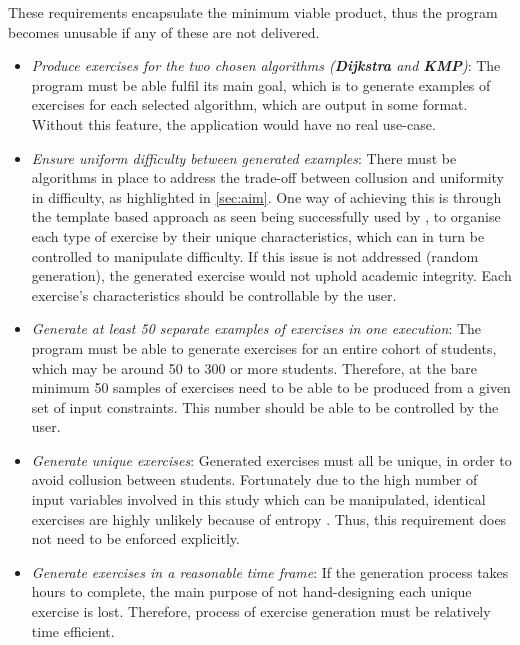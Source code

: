 \documentclass{l4proj}
\begin{document}
These requirements encapsulate the minimum viable product, thus the program becomes unusable if any of these are not delivered.
\begin{itemize}
	\item
	\emph{Produce exercises for the two chosen algorithms (\textbf{Dijkstra} and \textbf{KMP})}: The program must be able fulfil its main goal, which is to generate examples of exercises for each 		selected algorithm, which are output in some format. Without this feature, the application would have no real use-case. 
	\item
	\emph{Ensure uniform difficulty between generated examples}: There must be algorithms in place to address the trade-off between collusion and uniformity in difficulty, as highlighted in \autoref{sec:aim}. One way of achieving this is through the template based approach as seen being successfully used by \cite{Sad12}, to organise each type of exercise by their unique characteristics, which can in turn be controlled to manipulate difficulty. If this issue is not addressed (random generation), the generated exercise would not uphold academic integrity. Each exercise's characteristics should be controllable by the user.
	\item
	\emph{Generate at least 50 separate examples of exercises in one execution}: The program must be able to generate exercises for an entire cohort of students, which may be around 50 to 300 or more students. Therefore, at the bare minimum 50 samples of exercises need to be able to be produced from a given set of input constraints. This number should be able to be controlled by the user.
	\item
	\emph{Generate unique exercises}: Generated exercises must all be unique, in order to avoid collusion between students. Fortunately due to the high number of input variables involved in this study which can be manipulated, identical exercises are highly unlikely because of entropy \cite{}. Thus, this requirement does not need to be enforced explicitly.
	\item
	\emph{Generate exercises in a reasonable time frame}: If the generation process takes hours to complete, the main purpose of not hand-designing each unique exercise is lost. Therefore, process of exercise generation must be relatively time efficient. 
\end{itemize}
\end{document}
